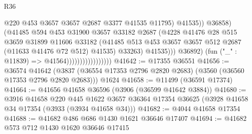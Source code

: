 \begin{lexlean}{R36}
\begin{coremodule}
                                                  @220
                                                  @453
                                                  @3657
                                                  @3657
                                                  @2687
                                                  @3377
                                                  @41535
                                                  @11795)
                                                @41535))
                                            @36858)
                                          (@41485
                                            @594
                                            @453
                                            @31900
                                            @3657
                                            @33182
                                            @2687
                                            (@4228
                                              @41476
                                              @28
                                              @515
                                              @3659
                                              @31899
                                              @11606
                                              @33182
                                              (@41485
                                                @513
                                                @453
                                                @3657
                                                @3657
                                                @512
                                                @2687
                                                (@11633 @41476 @72 @512)
                                                @41535)
                                              @33263)
                                            @41535)))
                                      @36892)
                                    (fun ("_" : @11839) => @41564)))))))))))))))))
@41642 := @17355 @36551
@41656 := @36574
    @41642
    (@3837 (@36554 @17353 @2796 @2820 @2683) (@3560 (@36560 @17353 @2796 @2820 @2683)))
    @1624
@41658 := @11499 (@36591 @17374)
@41664 := @41656 @41658 @36596 (@3906 (@36599 @41642 @3884))
@41680 := @3916
    @41658
    @220
    @445
    @1622
    @3657
    @36364
    @17354
    @36625
    (@3928 @41658 @34 @17354 (@3933 (@3934 @41658 @34)))
@41682 := @4044 @41658 @17354
@41688 := @41682 @486 @686 @1430 @1621 @36646 @17407
@41694 := @41682 @573 @712 @1430 @1620 @36646 @17415

\end{coremodule}
\end{lexlean}
